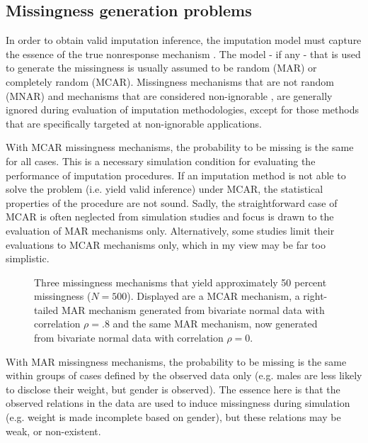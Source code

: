 \documentclass[12pt, a4paper]{article}
\begin{document}
\subsection*{Missingness generation problems}
In order to obtain valid imputation inference, the imputation model must capture the essence of the true nonresponse mechanism \citep{meng1994multiple}. The model - if any - that is used to generate the missingness is usually assumed to be random (MAR) or completely random (MCAR). Missingness mechanisms that are not random (MNAR) and mechanisms that are considered non-ignorable \citep[see e.g.][]{rubin1976inference}, are generally ignored during evaluation of imputation methodologies, except for those methods that are specifically targeted at non-ignorable applications.

With MCAR missingness mechanisms, the probability to be missing is the same for all cases. This is a necessary simulation condition for evaluating the performance of imputation procedures. If an imputation method is not able to solve the problem (i.e. yield valid inference) under MCAR, the statistical properties of the procedure are not sound. Sadly, the straightforward case of MCAR is often neglected from simulation studies and focus is drawn to the evaluation of MAR mechanisms only. Alternatively, some studies limit their evaluations to MCAR mechanisms only, which in my view may be far too simplistic. 
\begin{figure}[t!]
  \caption{Three missingness mechanisms that yield approximately 50 percent missingness ($N=500$). Displayed are a MCAR mechanism, a right-tailed MAR mechanism generated from bivariate normal data with correlation $\rho=.8$ and the same MAR mechanism, now generated from bivariate normal data with correlation $\rho= 0$.}
  \label{fig:mis.mech}
\end{figure}

With MAR missingness mechanisms, the probability to be missing is the same within groups of cases defined by the observed data only (e.g. males are less likely to disclose their weight, but gender is observed). The essence here is that the observed relations in the data are used to induce missingness during simulation (e.g. weight is made incomplete based on gender), but these relations may be weak, or non-existent. 
\end{document}

